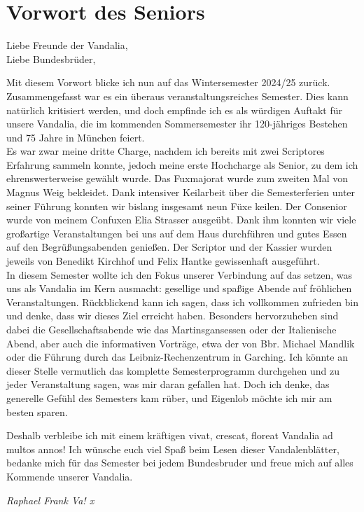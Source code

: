\section{Vorwort des Seniors}

Liebe Freunde der Vandalia,\\
Liebe Bundesbrüder,
\begin{multicols}{2}

Mit diesem Vorwort blicke ich nun auf das Wintersemester 2024/25 zurück. Zusammengefasst
war es ein überaus veranstaltungsreiches Semester. Dies kann natürlich
kritisiert werden, und doch empfinde ich es als würdigen Auftakt für unsere
Vandalia, die im kommenden Sommersemester ihr 120-jähriges Bestehen und 75
Jahre in München feiert.\\
Es war zwar meine dritte Charge, nachdem ich bereits mit zwei Scriptores Erfahrung sammeln
konnte, jedoch meine erste Hochcharge als Senior, zu dem ich ehrenswerterweise
gewählt wurde. Das Fuxmajorat wurde zum zweiten Mal von Magnus Weig bekleidet.
Dank intensiver Keilarbeit über die Semesterferien unter seiner Führung konnten
wir bislang insgesamt neun Füxe keilen. Der Consenior wurde von meinem Confuxen
Elia Strasser ausgeübt. Dank ihm konnten wir viele großartige Veranstaltungen
bei uns auf dem Haus durchführen und gutes Essen auf den Begrüßungsabenden
genießen. Der Scriptor und der Kassier wurden jeweils von Benedikt Kirchhof und
Felix Hantke gewissenhaft ausgeführt.\\
In diesem
Semester wollte ich den Fokus unserer Verbindung auf das setzen, was uns als
Vandalia im Kern ausmacht: gesellige und spaßige Abende auf fröhlichen
Veranstaltungen. Rückblickend kann ich sagen, dass ich vollkommen zufrieden bin
und denke, dass wir dieses Ziel erreicht haben. Besonders hervorzuheben sind
dabei die Gesellschaftsabende wie das Martinsgansessen oder der Italienische
Abend, aber auch die informativen Vorträge, etwa der von Bbr. Michael Mandlik
oder die Führung durch das Leibniz-Rechenzentrum in Garching. Ich könnte an
dieser Stelle vermutlich das komplette Semesterprogramm durchgehen und zu jeder
Veranstaltung sagen, was mir daran gefallen hat. Doch ich denke, das generelle
Gefühl des Semesters kam rüber, und Eigenlob möchte ich mir am besten sparen.

Deshalb verbleibe ich mit einem kräftigen vivat, crescat, floreat Vandalia ad
multos annos! Ich wünsche euch viel Spaß beim Lesen dieser
Vandalenblätter, bedanke mich für das Semester bei jedem Bundesbruder und freue
mich auf alles Kommende unserer Vandalia.

	\begin{flushright}
		\hfill\emph{Raphael Frank Va! x}
	\end{flushright}
\end{multicols}


